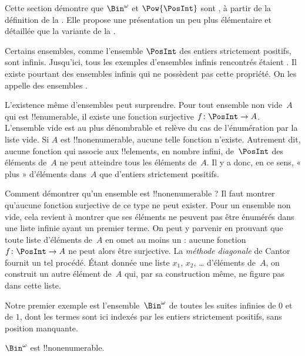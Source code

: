 \documentclass[../../../include/open-logic-section]{subfiles}
\begin{document}


\begin{editorial}
Cette section démontre que $\Bin^\omega$ et $\Pow{\PosInt}$ sont
, à partir de la définition de
la . Elle propose une présentation un peu plus
élémentaire et détaillée que la variante de la .
%
%
%
\end{editorial}

Certains ensembles, comme l’ensemble $\PosInt$ des entiers
strictement positifs, sont infinis. Jusqu’ici, tous les exemples
d’ensembles infinis rencontrés étaient .
Il existe pourtant des ensembles infinis qui ne possèdent pas
cette propriété. On les appelle des ensembles
\emph{}.

L’existence même d’ensembles  peut
surprendre. Pour tout ensemble non vide~$A$ qui est !!{enumerable},
il existe une fonction surjective $f \colon \PosInt \to A$.
L’ensemble vide est au plus dénombrable et relève du cas
de l’énumération par la liste vide.
%
Si $A$ est !!{nonenumerable}, aucune telle fonction n’existe.
Autrement dit, aucune fonction qui associe aux !!{element}s,
en nombre infini, de~$\PosInt$ des éléments de~$A$ ne peut atteindre
tous les éléments de~$A$. Il y a donc, en ce sens, « plus »
d’éléments dans~$A$ que d’entiers strictement positifs.

Comment démontrer qu’un ensemble est !!{nonenumerable} ?
Il faut montrer qu’aucune fonction surjective de ce type ne peut
exister. Pour un ensemble non vide, cela revient à montrer que
ses éléments ne peuvent pas être énumérés dans une liste infinie
ayant un premier terme. On peut y parvenir en prouvant que toute
liste d’éléments de~$A$ en omet au moins un : aucune fonction
$f\colon \PosInt \to A$ ne peut alors être surjective.
La \emph{méthode diagonale} de Cantor fournit un tel procédé.
Étant donnée une liste $x_1$, $x_2$, \dots{} d’éléments de~$A$,
on construit un autre élément de~$A$ qui, par sa construction
même, ne figure pas dans cette liste.

Notre premier exemple est l’ensemble~$\Bin^\omega$ de toutes
les suites infinies de $0$ et de $1$, dont les termes sont ici
indexés par les entiers strictement positifs, sans position manquante.

\begin{thm}
$\Bin^\omega$ est !!{nonenumerable}.
\end{thm}
\end{document}
